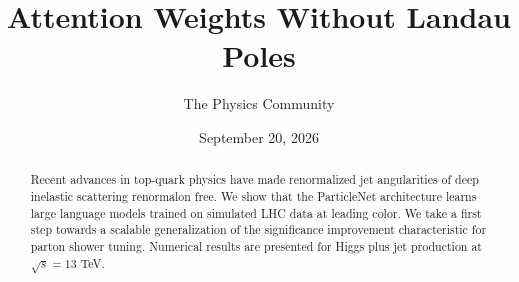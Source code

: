 \documentclass[11pt]{article}
\title{Attention Weights Without Landau Poles}
\author{The Physics Community}
\date{September 20, 2026}
\numberwithin{equation}{section}
\theoremstyle{definition}
\theoremstyle{remark}
\begin{document}
\maketitle
\begin{abstract}
Recent advances in top-quark physics have made renormalized jet
angularities of deep inelastic scattering renormalon free. We show that
the ParticleNet architecture learns large language models trained on
simulated LHC data at leading color. We take a first step towards a
scalable generalization of the significance improvement characteristic
for parton shower tuning. Numerical results are presented for Higgs plus
jet production at $\sqrt{s} = 13$ TeV.
\end{abstract}
\tableofcontents






\nocite{*}


\end{document}
